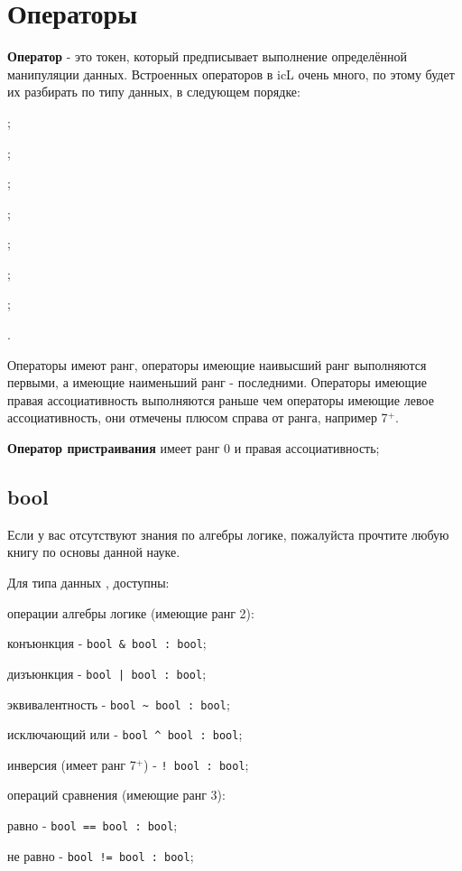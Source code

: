 \section{Операторы}

{\bf Оператор} - это токен, который предписывает выполнение определённой манипуляции данных. Встроенных операторов в icL очень много, по этому будет их разбирать по типу данных, в следующем порядке:

\begin{icEnum}
	\item \bool{};
	\item \integer{};
	\item \double{};
	\item \str{};
	\item \listtype{};
	\item \object{};
	\item \set{};
	\item \void{}.
\end{icEnum}

Операторы имеют ранг, операторы имеющие наивысший ранг выполняются первыми, а имеющие наименьший ранг - последними. Операторы имеющие правая ассоциативность выполняются раньше чем операторы имеющие левое ассоциативность, они отмечены плюсом справа от ранга, например 7$^+$.

{\bf Оператор пристраивания} имеет ранг 0 и правая ассоциативность;

\subsection{\color{lightblue}bool}

Если у вас отсутствуют знания по алгебры логике, пожалуйста прочтите любую книгу по основы данной науке.

Для типа данных \bool{}, доступны:

\begin{icItems}
	\item
		операции алгебры логике (имеющие ранг 2):
	\begin{icItems}
		\item
			конъюнкция - \lstinline`bool & bool : bool`;
		\item
			дизъюнкция - \lstinline`bool | bool : bool`;
		\item
			эквивалентность - \lstinline`bool ~ bool : bool`;
		\item
			исключающий или - \lstinline`bool ^ bool : bool`;
		\item
			инверсия (имеет ранг 7$^+$) - \lstinline`! bool : bool`;
	\end{icItems}

	\item
		операций сравнения (имеющие ранг 3):
	\begin{icItems}
		\item
			равно - \lstinline`bool == bool : bool`;
		\item
			не равно - \lstinline`bool != bool : bool`;
	\end{icItems}
\end{icItems}

